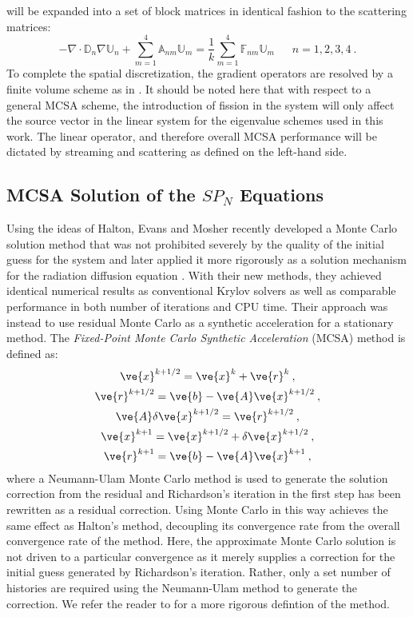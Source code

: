 \documentclass[letterpaper,12pt]{article}
\begin{document}
will be expanded into a set of block matrices in identical fashion to
the scattering matrices:
\begin{equation}
  -\nabla \cdot \mathbb{D}_n \nabla \mathbb{U}_n + \sum_{m=1}^4
  \mathbb{A}_{nm} \mathbb{U}_m = \frac{1}{k} \sum_{m=1}^4
  \mathbb{F}_{nm} \mathbb{U}_m\ \ \ \ \ \ \ n = 1,2,3,4\:.
  \label{eq:spn_fission_matrix}
\end{equation}
To complete the spatial discretization, the gradient operators are
resolved by a finite volume scheme as in
\cite{evans_simplified_2013}. It should be noted here that with
respect to a general MCSA scheme, the introduction of fission in the
system will only affect the source vector in the linear system for the
eigenvalue schemes used in this work. The linear operator, and
therefore overall MCSA performance will be dictated by streaming and
scattering as defined on the left-hand side.

\subsection{MCSA Solution of the $SP_N$ Equations}
\label{subsec:mcsa_solution}
Using the ideas of Halton, Evans and Mosher recently developed a Monte
Carlo solution method that was not prohibited severely by the quality
of the initial guess for the system \cite{evans_monte_2009} and later
applied it more rigorously as a solution mechanism for the radiation
diffusion equation \cite{evans_monte_2012}. With their new methods,
they achieved identical numerical results as conventional Krylov
solvers as well as comparable performance in both number of iterations
and CPU time. Their approach was instead to use residual Monte Carlo
as a synthetic acceleration for a stationary method. The
\textit{Fixed-Point Monte Carlo Synthetic Acceleration} (MCSA) method
is defined as:
\begin{subequations}
  \begin{gather}
    \ve{x}^{k+1/2} = \ve{x}^k + \ve{r}^k\:,\\
    \ve{r}^{k+1/2} = \ve{b} - \ve{A}\ve{x}^{k+1/2}\:,\\
    \ve{A}\delta\ve{x}^{k+1/2} = \ve{r}^{k+1/2}\:,\\
    \ve{x}^{k+1} = \ve{x}^{k+1/2} + \delta \ve{x}^{k+1/2}\:,\\
    \ve{r}^{k+1} = \ve{b} - \ve{A}\ve{x}^{k+1}\:,
  \end{gather}
  \label{eq:mcsa}
\end{subequations}
where a Neumann-Ulam Monte Carlo method is used to generate the
solution correction from the residual and Richardson's iteration in
the first step has been rewritten as a residual correction. Using
Monte Carlo in this way achieves the same effect as Halton's method,
decoupling its convergence rate from the overall convergence rate of
the method. Here, the approximate Monte Carlo solution is not driven
to a particular convergence as it merely supplies a correction for the
initial guess generated by Richardson's iteration. Rather, only a set
number of histories are required using the Neumann-Ulam method to
generate the correction. We refer the reader to
\cite{evans_monte_2012} for a more rigorous defintion of the method.
\end{document}
